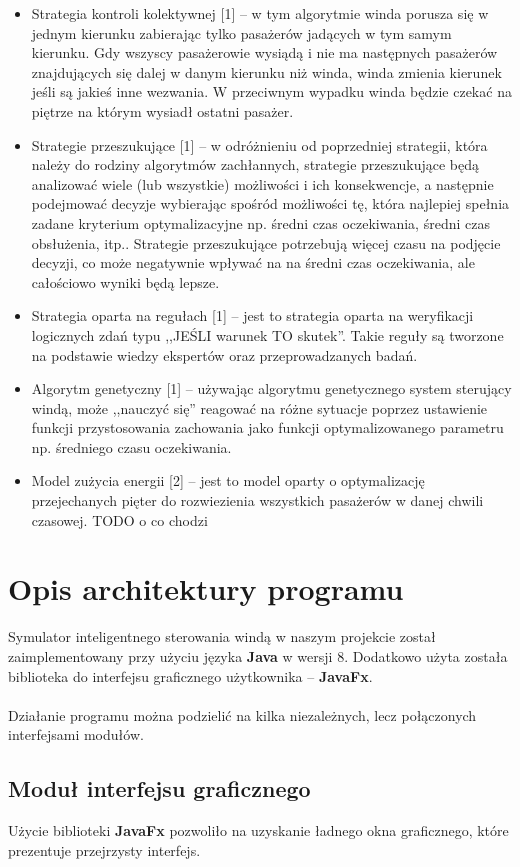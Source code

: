 \documentclass[a4paper,11pt]{article}
\begin{document}
\begin{itemize}
\item Strategia kontroli kolektywnej [1] -- w tym algorytmie winda porusza się w jednym kierunku zabierając tylko pasażerów jadących w tym samym kierunku. Gdy wszyscy pasażerowie wysiądą i nie ma następnych pasażerów znajdujących się dalej w danym kierunku niż winda, winda zmienia kierunek jeśli są jakieś inne wezwania. W przeciwnym wypadku winda będzie czekać na piętrze na którym wysiadł ostatni pasażer.
\item Strategie przeszukujące [1] -- w odróżnieniu od poprzedniej strategii, która należy do rodziny algorytmów zachłannych, strategie przeszukujące będą analizować wiele (lub wszystkie) możliwości i ich konsekwencje, a następnie podejmować decyzje wybierając spośród możliwości tę, która najlepiej spełnia zadane kryterium optymalizacyjne np. średni czas oczekiwania, średni czas obsłużenia, itp.. Strategie przeszukujące potrzebują więcej czasu na podjęcie decyzji, co może negatywnie wpływać na na średni czas oczekiwania, ale całościowo wyniki będą lepsze.
\item Strategia oparta na regułach [1] -- jest to strategia oparta na weryfikacji logicznych zdań typu ,,JEŚLI warunek TO skutek''. Takie reguły są tworzone na podstawie wiedzy ekspertów oraz przeprowadzanych badań.
\item Algorytm genetyczny [1] -- używając algorytmu genetycznego system sterujący windą, może ,,nauczyć się'' reagować na różne sytuacje poprzez ustawienie funkcji przystosowania zachowania jako funkcji optymalizowanego parametru np. średniego czasu oczekiwania.
\item Model zużycia energii [2] -- jest to model oparty o optymalizację przejechanych pięter do rozwiezienia wszystkich pasażerów w danej chwili czasowej. \huge{TODO o co chodzi}
\end{itemize}

\section{Opis architektury programu}
Symulator inteligentnego sterowania windą w naszym projekcie został zaimplementowany przy użyciu języka \textbf{Java} w wersji 8. Dodatkowo użyta została biblioteka do interfejsu graficznego użytkownika -- \textbf{JavaFx}.\\~\\
Działanie programu można podzielić na kilka niezależnych, lecz połączonych interfejsami modułów.
\subsection{Moduł interfejsu graficznego}
Użycie biblioteki \textbf{JavaFx} pozwoliło na uzyskanie ładnego okna graficznego, które prezentuje przejrzysty interfejs.\\~\\
\end{document}
